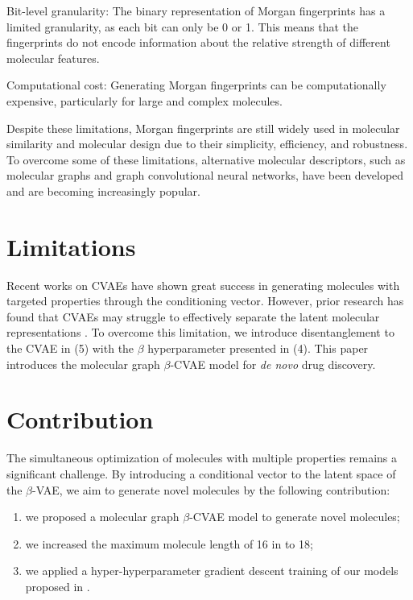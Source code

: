 Bit-level granularity: The binary representation of Morgan fingerprints has a limited granularity, as each bit can only be 0 or 1. This means that the fingerprints do not encode information about the relative strength of different molecular features.

Computational cost: Generating Morgan fingerprints can be computationally expensive, particularly for large and complex molecules.

Despite these limitations, Morgan fingerprints are still widely used in molecular similarity and molecular design due to their simplicity, efficiency, and robustness. To overcome some of these limitations, alternative molecular descriptors, such as molecular graphs and graph convolutional neural networks, have been developed and are becoming increasingly popular.

\section{Limitations}
Recent works on CVAEs have shown great success in generating molecules with targeted properties through the conditioning vector. However, prior research has found that CVAEs may struggle to effectively separate the latent molecular representations \cite{richards2022conditional}. To overcome this limitation, we introduce disentanglement to the CVAE in (5) with the $\beta$ hyperparameter presented in (4). This paper introduces the molecular graph $\beta$-CVAE model for \textit{de novo} drug discovery. 

\section{Contribution}
 The simultaneous optimization of molecules with multiple properties remains a significant challenge. By introducing a conditional vector to the latent space of the $\beta$-VAE, we aim to generate novel molecules by the following contribution: 
\begin{enumerate}
\item we proposed a molecular graph $\beta$-CVAE model to generate novel molecules;
  \item we increased the maximum molecule length of 16 in \cite{lee2022mgcvae} to 18;
  \item we applied a hyper-hyperparameter gradient descent training of our models proposed in \cite{DBLP:journals/corr/abs-1909-13371}.
\end{enumerate}
